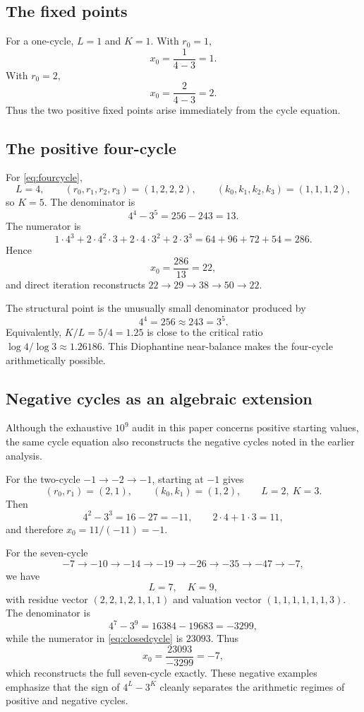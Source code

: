 \documentclass[11pt]{article}
\begin{document}
\subsection{The fixed points}
For a one-cycle, $L=1$ and $K=1$.  With $r_0=1$,
\[
x_0=\frac{1}{4-3}=1.
\]
With $r_0=2$,
\[
x_0=\frac{2}{4-3}=2.
\]
Thus the two positive fixed points arise immediately from the cycle equation.

\subsection{The positive four-cycle}
For \eqref{eq:fourcycle},
\[
L=4,\qquad
(r_0,r_1,r_2,r_3)=(1,2,2,2),
\qquad
(k_0,k_1,k_2,k_3)=(1,1,1,2),
\]
so $K=5$.  The denominator is
\begin{equation}
4^4-3^5=256-243=13.
\end{equation}
The numerator is
\[
1\cdot4^3
+2\cdot4^2\cdot3
+2\cdot4\cdot3^2
+2\cdot3^3
=64+96+72+54=286.
\]
Hence
\begin{equation}
x_0=\frac{286}{13}=22,
\end{equation}
and direct iteration reconstructs
$22\to29\to38\to50\to22$.

The structural point is the unusually small denominator produced by
\begin{equation}
4^4=256\approx243=3^5.
\end{equation}
Equivalently, $K/L=5/4=1.25$ is close to the critical ratio $\log4/\log3\approx1.26186$.  This Diophantine near-balance makes the four-cycle arithmetically possible.

\subsection{Negative cycles as an algebraic extension}
Although the exhaustive $10^9$ audit in this paper concerns positive starting values, the same cycle equation also reconstructs the negative cycles noted in the earlier analysis.

For the two-cycle $-1\to-2\to-1$, starting at $-1$ gives
\[
(r_0,r_1)=(2,1),\qquad(k_0,k_1)=(1,2),
\qquad L=2,\ K=3.
\]
Then
\[
4^2-3^3=16-27=-11,
\qquad
2\cdot4+1\cdot3=11,
\]
and therefore $x_0=11/(-11)=-1$.

For the seven-cycle
\begin{equation}
-7\to-10\to-14\to-19\to-26\to-35\to-47\to-7,
\end{equation}
we have
\[
L=7,\quad K=9,
\]
with residue vector $(2,2,1,2,1,1,1)$ and valuation vector $(1,1,1,1,1,1,3)$.  The denominator is
\[
4^7-3^9=16384-19683=-3299,
\]
while the numerator in \eqref{eq:closedcycle} is $23093$.  Thus
\[
x_0=\frac{23093}{-3299}=-7,
\]
which reconstructs the full seven-cycle exactly.  These negative examples emphasize that the sign of $4^L-3^K$ cleanly separates the arithmetic regimes of positive and negative cycles.
\end{document}
